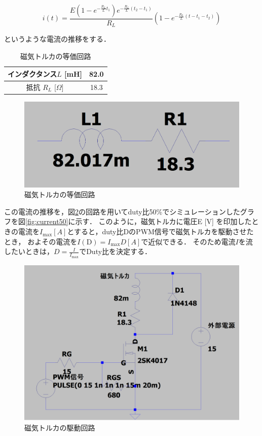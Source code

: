 \begin{equation}
	i(t) = \frac{E\left(1-e^{-\frac{R_L}{L}t_1}\right)e^{-\frac{R_L}{L}(t_2-t_1)}}{R_L}\left(1-e^{-\frac{R_L}{L}(t-t_1-t_2)}\right)
\end{equation}

というような電流の推移をする．

\begin{table}[H]
	\centering
	\caption{磁気トルカの等価回路}
	\label{table:torquer2}
	\begin{tabular}{|c||c|}
		\hline
		インダクタンス$L$ [mH] & 	82.0 \\ \hline
		抵抗 $R_L$ [$\Omega $] & 18.3 \\ \hline 
	\end{tabular}
\end{table}

\begin{figure}[H]
	\centering
		\includegraphics[scale=0.3]{./figure/touka.png}
		\caption{磁気トルカの等価回路}
		\label{fig:touka}
\end{figure}

この電流の推移を，図\ref{fig:cirkit}の回路を用いてduty比50\%でシミュレーションしたグラフを図\ref{fig:current50}に示す．
このように，磁気トルカに電圧E [V] を印加したときの電流を$I_\mathrm{max} [A]$とすると，duty比DのPWM信号で磁気トルカを駆動させたとき，
およその電流を$I(\mathrm{D})=I_\mathrm{max}D [A]$で近似できる． 
そのため電流$I$を流したいときは，$D=\frac{I}{I_\mathrm{max}}$でDuty比を決定する．

\begin{figure}[H]
	\centering
		\includegraphics[scale=0.3]{./figure/駆動回路.png}
		\caption{磁気トルカの駆動回路}
		\label{fig:cirkit}
\end{figure}

